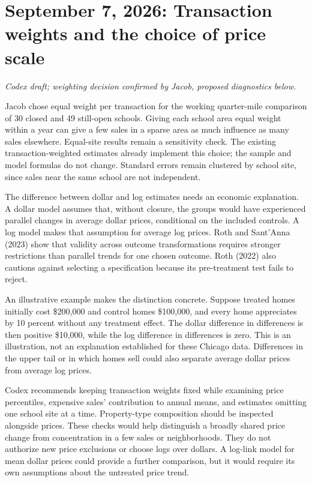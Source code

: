 \section*{September 7, 2026: Transaction weights and the choice of price scale}
\textit{Codex draft; weighting decision confirmed by Jacob, proposed diagnostics below.}

Jacob chose equal weight per transaction for the working quarter-mile
comparison of 30 closed and 49 still-open schools. Giving each school area
equal weight within a year can give a few sales in a sparse area as much
influence as many sales elsewhere. Equal-site results remain a sensitivity
check. The existing transaction-weighted estimates already implement this
choice; the sample and model formulas do not change. Standard errors remain
clustered by school site, since sales near the same school are not independent.

The difference between dollar and log estimates needs an economic explanation.
A dollar model assumes that, without closure, the groups would have experienced
parallel changes in average dollar prices, conditional on the included
controls. A log model makes that assumption for average log prices.
Roth and Sant'Anna (2023) show that validity across outcome transformations
requires stronger restrictions than parallel trends for one chosen outcome.
Roth (2022) also cautions against selecting a specification because its
pre-treatment test fails to reject.

An illustrative example makes the distinction concrete. Suppose treated
homes initially cost \$200,000 and control homes \$100,000, and every home
appreciates by 10 percent without any treatment effect. The dollar difference
in differences is then positive \$10,000, while the log difference in
differences is zero. This is an illustration, not an explanation established
for these Chicago data. Differences in the upper tail or in which homes sell
could also separate average dollar prices from average log prices.

Codex recommends keeping transaction weights fixed while examining price
percentiles, expensive sales' contribution to annual means, and estimates
omitting one school site at a time. Property-type composition should be
inspected alongside prices. These checks would help distinguish a broadly
shared price change from concentration in a few sales or neighborhoods.
They do not authorize new price exclusions or choose logs over dollars.
A log-link model for mean dollar prices could provide a further comparison,
but it would require its own assumptions about the untreated price trend.

